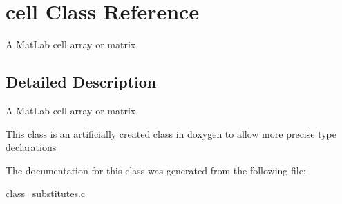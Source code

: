 \hypertarget{classcell}{\section{cell Class Reference}
\label{classcell}
}


A Mat\-Lab cell array or matrix.  




\subsection{Detailed Description}
A Mat\-Lab cell array or matrix. 

This class is an artificially created class in doxygen to allow more precise type declarations 

The documentation for this class was generated from the following file\-:\begin{DoxyCompactItemize}
\item 
\hyperlink{class__substitutes_8c}{class\-\_\-substitutes.\-c}\end{DoxyCompactItemize}
